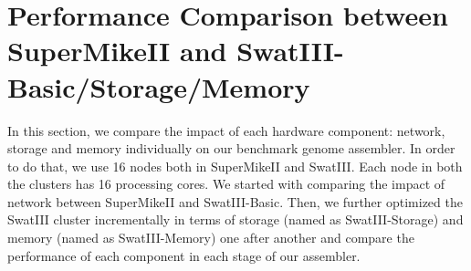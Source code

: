 \documentclass[conference]{IEEEtran}
\begin{document}
\section {Performance Comparison between SuperMikeII and SwatIII-Basic/Storage/Memory} \label{IndividualHWEffect}
In this section, we compare the impact of each hardware component: network, storage and memory individually on our benchmark genome assembler.
In order to do that, we use 16 nodes both in SuperMikeII and SwatIII. Each node in both the clusters has 16 processing cores.
We started with comparing the impact of network between SuperMikeII and SwatIII-Basic.
Then, we further optimized the SwatIII cluster incrementally in terms of storage (named as SwatIII-Storage) and memory (named as SwatIII-Memory) one after another and compare the performance of each component in each stage of our assembler.
\end{document}
